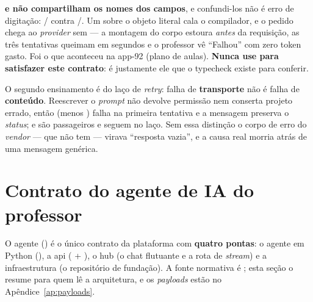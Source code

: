 \begin{regra}
\textbf{ e  não compartilham os nomes dos campos},
e confundi-los não é erro de digitação: / contra
/. Um  sobre o objeto literal cala o
compilador, e o pedido chega ao \emph{provider} sem  ---
a montagem do corpo estoura \emph{antes} da requisição, as três tentativas
queimam em segundos e o professor vê \enquote{Falhou} com zero token gasto.
Foi o que aconteceu na app-92 (plano de aulas). \textbf{Nunca use 
para satisfazer este contrato}: é justamente ele que o typecheck existe para
conferir.

O segundo ensinamento é do laço de \emph{retry}: falha de \textbf{transporte}
não é falha de \textbf{conteúdo}. Reescrever o \emph{prompt} não devolve
permissão nem conserta projeto errado, então  (menos ) falha na
primeira tentativa e a mensagem preserva o \emph{status};  e 
são passageiros e seguem no laço. Sem essa distinção o corpo de erro do
\emph{vendor} --- que não tem  --- virava \enquote{resposta
vazia}, e a causa real morria atrás de uma mensagem genérica.
\end{regra}

\section{Contrato do agente de IA do professor}
\label{sec:contrato-agente}

O agente () é o único contrato da plataforma com \textbf{quatro
pontas}: o agente em Python (), a api
( + ), o hub (o chat
flutuante e a rota de \emph{stream}) e a infraestrutura (o repositório de
fundação). A fonte normativa é ; esta seção
o resume para quem lê a arquitetura, e os \emph{payloads} estão no
Apêndice~\ref{ap:payloads}.

